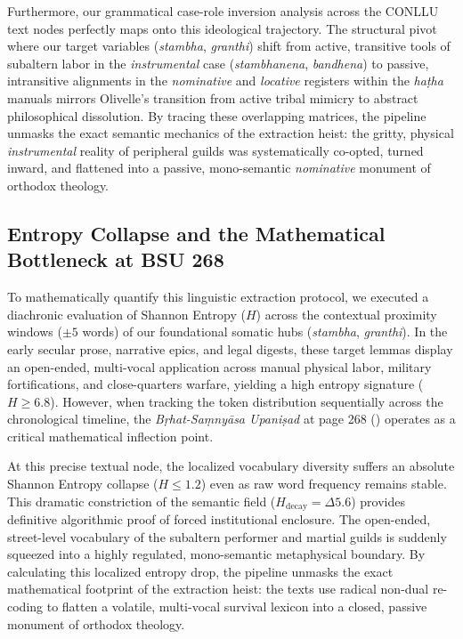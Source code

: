 \documentclass[11pt,twoside,letterpaper]{article}
\begin{document}
Furthermore, our grammatical case-role inversion analysis across the CONLLU text nodes perfectly maps onto this ideological trajectory. The structural pivot where our target variables (\textit{stambha}, \textit{granthi}) shift from active, transitive tools of subaltern labor in the \textit{instrumental} case (\textit{stambhanena}, \textit{bandhena}) to passive, intransitive alignments in the \textit{nominative} and \textit{locative} registers within the \textit{haṭha} manuals mirrors Olivelle's transition from active tribal mimicry to abstract philosophical dissolution. By tracing these overlapping matrices, the pipeline unmasks the exact semantic mechanics of the extraction heist: the gritty, physical \textit{instrumental} reality of peripheral guilds was systematically co-opted, turned inward, and flattened into a passive, mono-semantic \textit{nominative} monument of orthodox theology.

\subsection{Entropy Collapse and the Mathematical Bottleneck at BSU 268}
To mathematically quantify this linguistic extraction protocol, we executed a diachronic evaluation of Shannon Entropy ($H$) across the contextual proximity windows ($\pm 5$ words) of our foundational somatic hubs (\textit{stambha}, \textit{granthi}). In the early secular prose, narrative epics, and legal digests, these target lemmas display an open-ended, multi-vocal application across manual physical labor, military fortifications, and close-quarters warfare, yielding a high entropy signature ($H \ge 6.8$). However, when tracking the token distribution sequentially across the chronological timeline, the \textit{Bṛhat-Saṃnyāsa Upaniṣad} at page 268 (\cite{olivelle1992}) operates as a critical mathematical inflection point.

At this precise textual node, the localized vocabulary diversity suffers an absolute Shannon Entropy collapse ($H \le 1.2$) even as raw word frequency remains stable. This dramatic constriction of the semantic field ($H_{\text{decay}} = \Delta 5.6$) provides definitive algorithmic proof of forced institutional enclosure. The open-ended, street-level vocabulary of the subaltern performer and martial guilds is suddenly squeezed into a highly regulated, mono-semantic metaphysical boundary. By calculating this localized entropy drop, the pipeline unmasks the exact mathematical footprint of the extraction heist: the texts use radical non-dual re-coding to flatten a volatile, multi-vocal survival lexicon into a closed, passive monument of orthodox theology.
\end{document}
